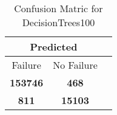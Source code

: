 \begin{table}[] 
\caption{Confusion Matric for DecisionTrees100} 
\label{Table: Prediction Accuracy-NoneDecisionTrees10099.0EKF-ignoreReflection-Reflection} 
\centering 
\begin{tabular} 
 {@{}ccc@{}} 
\toprule 
\multicolumn{2}{c}{\textbf{Predicted}}
 \\ \midrule 
\multicolumn{1}{|c|}{Failure} & 
\multicolumn{1}{c|}{No Failure}
 \\ \midrule 
\multicolumn{1}{|c|}{\color{green}\textbf{153746}} & 
\multicolumn{1}{c|}{\color{red}\textbf{468}}
 \\ \midrule 
\multicolumn{1}{|c|}{\color{red}\textbf{811}} & 
\multicolumn{1}{c|}{\color{green}\textbf{15103}}
 \\ \bottomrule 
\end{tabular} 
\end{table} 
